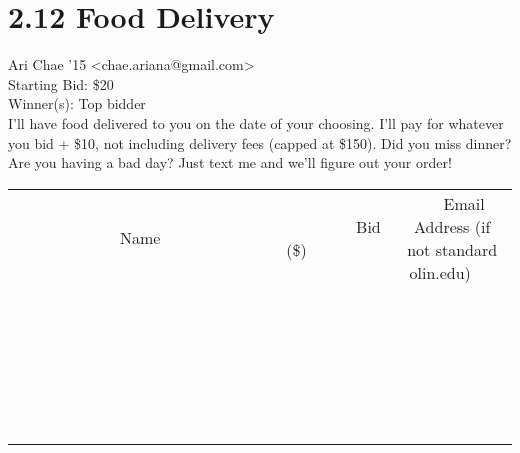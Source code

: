 \documentclass[11pt]{article}
\begin{document}
					\section*{2.12 Food Delivery}
					Ari Chae '15 <chae.ariana@gmail.com> \\
					Starting Bid: \$20 \\
					Winner(s): Top bidder \\
					I'll have food delivered to you on the date of your choosing. I'll pay for whatever you bid + \$10, not including delivery fees (capped at \$150). Did you miss dinner? Are you having a bad day? Just text me and we'll figure out your order! \\
					[6ex]
					\begin{tabular}{c c c}
						~~~~~~~~~~~~~Name~~~~~~~~~~~~~ & ~~~~~~~~~Bid (\$)~~~~~~~~~ & ~~~Email Address (if not standard olin.edu)~~~ \\
				
 & & \\
\hline
 & & \\
\hline
 & & \\
\hline
 & & \\
\hline
 & & \\
\hline
 & & \\
\hline
 & & \\
\hline
 & & \\
\hline
 & & \\
\hline
 & & \\
\hline
 & & \\
\hline
 & & \\
\hline
 & & \\
\hline
 & & \\
\hline
 & & \\
\hline
 & & \\
\hline
 & & \\
\hline
 & & \\
\hline
 & & \\
\hline
 & & \\
\hline
 & & \\
\hline
 & & \\
\hline
 & & \\
\hline
 & & \\
\hline
 & & \\
\hline
 & & \\
\hline
					\end{tabular}
					\clearpage
				
\end{document}
